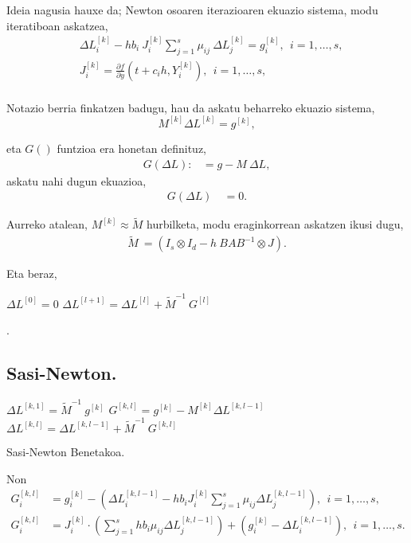Ideia nagusia hauxe da; Newton osoaren iterazioaren ekuazio sistema, modu iteratiboan askatzea,
\begin{align*}
&\Delta L_i^{[k]} - h b_i \ J_i^{[k]} \sum_{j=1}^{s} \mu_{ij}  \ \Delta L_j^{[k]} = g_i^{[k]}  , \ \ i=1,\dots,s,\\
&J_i^{[k]}=\frac{\partial f}{\partial y} (t+c_ih, Y_i^{[k]}), \ \  i=1,\dots,s,\\
\end{align*}

Notazio berria finkatzen badugu, hau da askatu beharreko ekuazio sistema,
\begin{equation*}
M^{[k]} \Delta L^{[k]}=g^{[k]},
\end{equation*}

eta $G()$  funtzioa era honetan definituz,
\begin{align*}
G(\Delta L):&=g-M \ \Delta L,
\end{align*}
askatu nahi dugun ekuazioa,
\begin{align*}
G(\Delta L) \ &=0.
\end{align*}

Aurreko atalean,  $M^{[k]} \approx \tilde{M}$  hurbilketa, modu eraginkorrean askatzen ikusi dugu, 
\begin{align*}
\tilde{M} \ =(I_s \otimes I_d - h \ BAB^{-1} \otimes J).
\end{align*}

Eta beraz,
\begin{algorithm}[h!]
 \BlankLine
  $\Delta L^{[0]}=0$\;
  {
    $\Delta L^{[l+1]} = \Delta L^{[l]}+ \tilde{M}^{-1} \ G^{[l]}$\;
  }
 \caption{.}
\end{algorithm}

\subsection*{Sasi-Newton.}


\begin{algorithm}[h!]
  $ \Delta L^{[k,1]} = \tilde{M}^{-1} \ g^{[k]}$\;
  \BlankLine
  {
   \BlankLine
   $G^{[k,l]} = g^{[k]}- M^{[k]} \Delta L^{[k,l-1]}$\;
   \BlankLine
   $\Delta L^{[k,l]}=\Delta L^{[k,l-1]}+ \tilde{M}^{-1} \ G^{[k,l]}$\;
  }
 \caption{Sasi-Newton Benetakoa.}
 \label{alg:901}
\end{algorithm}

Non
\begin{align*}
 G_i^{[k,l]} &=g_i^{[k]}- (\Delta L_i^{[k,l-1]}-hb_i J_i^{[k]} \sum_{j=1}^{s} \mu_{ij} \Delta L_{j}^{[k,l-1]}), \ \ i=1,\dots,s,\\
 G_i^{[k,l]} &=J_i^{[k]} \cdot (\sum_{j=1}^{s} hb_i\mu_{ij} \Delta L_{j}^{[k,l-1]})+(g_i^{[k]}-\Delta L_i^{[k,l-1]}), \ \ i=1,\dots,s.
\end{align*}

